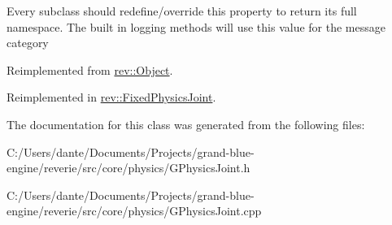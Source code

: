 Every subclass should redefine/override this property to return its full namespace. The built in logging methods will use this value for the message category 

Reimplemented from \mbox{\hyperlink{classrev_1_1_object_aaeb638d3e10f361c56c211a318a27f3d}{rev\+::\+Object}}.



Reimplemented in \mbox{\hyperlink{classrev_1_1_fixed_physics_joint_ae0bb4a64e824f0cc378b9e00be7ab469}{rev\+::\+Fixed\+Physics\+Joint}}.



The documentation for this class was generated from the following files\+:\begin{DoxyCompactItemize}
\item 
C\+:/\+Users/dante/\+Documents/\+Projects/grand-\/blue-\/engine/reverie/src/core/physics/G\+Physics\+Joint.\+h\item 
C\+:/\+Users/dante/\+Documents/\+Projects/grand-\/blue-\/engine/reverie/src/core/physics/G\+Physics\+Joint.\+cpp\end{DoxyCompactItemize}

